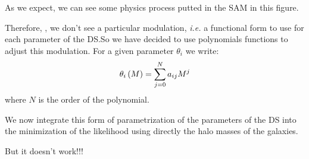 As we expect, we can see some physics process putted in the SAM in this
figure.

Therefore, , we don't see a
particular modulation, \textit{i.e.} a functional form to use for each
parameter of the DS.\@ So we have decided to use polynomials functions to
adjust this modulation. For a given parameter $\theta_i$ we write:
%
\begin{equation}
    \theta_i\left({M}\right)=\sum_{j=0}^N{a_{ij}{M^j}}
\end{equation}
%
where $N$ is the order of the polynomial.

We now integrate this form of parametrization of the parameters of the DS into
the minimization of the likelihood using directly the halo masses of the
galaxies.

But it doesn't work!!!
%
